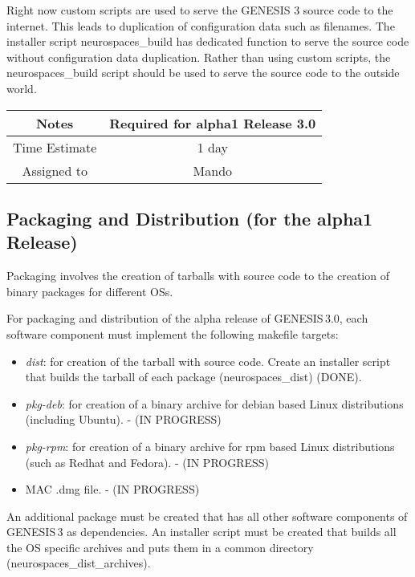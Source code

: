 \documentclass[12pt]{article}
\begin{document}
Right now custom scripts are used to serve the GENESIS 3 source code
to the internet.  This leads to duplication of configuration data such
as filenames.  The installer script neurospaces\_build has dedicated
function to serve the source code without configuration data
duplication.  Rather than using custom scripts, the neurospaces\_build
script should be used to serve the source code to the outside world.

{
  \vspace{5mm}
  \centering
  \begin{tabular}{|c|c|}
    \hline
    Notes
    & Required for alpha1 Release 3.0 \\
    \hline
    Time Estimate
    & 1 day \\
    \hline
    Assigned to
    & Mando \\
    \hline
  \end{tabular}
}


\subsection{Packaging and Distribution (for the alpha1 Release)}

Packaging involves the creation of tarballs with source code to the
creation of binary packages for different OSs.

For packaging and distribution of the alpha release of GENESIS\,3.0,
each software component must implement the following makefile targets:

\begin{itemize}
\item {\it dist}: for creation of the tarball with source code.
  Create an installer script that builds the tarball of each package
  (neurospaces\_dist) (DONE).
\item {\it pkg-deb}: for creation of a binary archive for debian based
  Linux distributions (including Ubuntu). - (IN PROGRESS)
\item {\it pkg-rpm}: for creation of a binary archive for rpm based Linux
  distributions (such as Redhat and Fedora). - (IN PROGRESS)
\item MAC .dmg file. - (IN PROGRESS)
\end{itemize}

An additional package must be created that has all other software
components of GENESIS\,3 as dependencies.  An installer script must
be created that builds all the OS specific archives and puts them in a
common directory (neurospaces\_dist\_archives).
\end{document}

